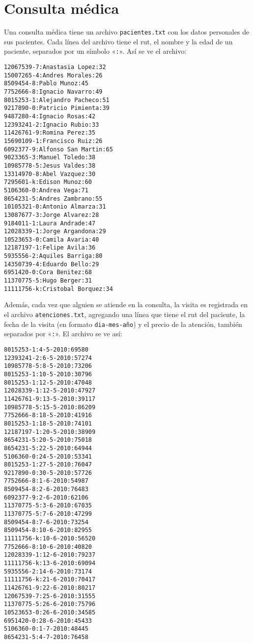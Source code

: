 \section{Consulta médica}

Una consulta médica tiene un archivo \lstinline!pacientes.txt! con los
datos personales de sus pacientes. Cada línea del archivo tiene el rut,
el nombre y la edad de un paciente, separados por un símbolo
«\lstinline!:!». Así se ve el archivo:

\begin{lstlisting}[language=file]
12067539-7:Anastasia Lopez:32
15007265-4:Andres Morales:26
8509454-8:Pablo Munoz:45
7752666-8:Ignacio Navarro:49
8015253-1:Alejandro Pacheco:51
9217890-0:Patricio Pimienta:39
9487280-4:Ignacio Rosas:42
12393241-2:Ignacio Rubio:33
11426761-9:Romina Perez:35
15690109-1:Francisco Ruiz:26
6092377-9:Alfonso San Martin:65
9023365-3:Manuel Toledo:38
10985778-5:Jesus Valdes:38
13314970-8:Abel Vazquez:30
7295601-k:Edison Munoz:60
5106360-0:Andrea Vega:71
8654231-5:Andres Zambrano:55
10105321-0:Antonio Almarza:31
13087677-3:Jorge Alvarez:28
9184011-1:Laura Andrade:47
12028339-1:Jorge Argandona:29
10523653-0:Camila Avaria:40
12187197-1:Felipe Avila:36
5935556-2:Aquiles Barriga:80
14350739-4:Eduardo Bello:29
6951420-0:Cora Benitez:68
11370775-5:Hugo Berger:31
11111756-k:Cristobal Borquez:34
\end{lstlisting}

Además, cada vez que alguien se atiende en la consulta, la visita es
registrada en el archivo \lstinline!atenciones.txt!, agregando una línea
que tiene el rut del paciente, la fecha de la visita (en formato
\texttt{dia-mes-año}) y el precio de la atención, también separados
por «\lstinline!:!». El archivo se ve así:

\begin{lstlisting}[language=file]
8015253-1:4-5-2010:69580
12393241-2:6-5-2010:57274
10985778-5:8-5-2010:73206
8015253-1:10-5-2010:30796
8015253-1:12-5-2010:47048
12028339-1:12-5-2010:47927
11426761-9:13-5-2010:39117
10985778-5:15-5-2010:86209
7752666-8:18-5-2010:41916
8015253-1:18-5-2010:74101
12187197-1:20-5-2010:38909
8654231-5:20-5-2010:75018
8654231-5:22-5-2010:64944
5106360-0:24-5-2010:53341
8015253-1:27-5-2010:76047
9217890-0:30-5-2010:57726
7752666-8:1-6-2010:54987
8509454-8:2-6-2010:76483
6092377-9:2-6-2010:62106
11370775-5:3-6-2010:67035
11370775-5:7-6-2010:47299
8509454-8:7-6-2010:73254
8509454-8:10-6-2010:82955
11111756-k:10-6-2010:56520
7752666-8:10-6-2010:40820
12028339-1:12-6-2010:79237
11111756-k:13-6-2010:69094
5935556-2:14-6-2010:73174
11111756-k:21-6-2010:70417
11426761-9:22-6-2010:80217
12067539-7:25-6-2010:31555
11370775-5:26-6-2010:75796
10523653-0:26-6-2010:34585
6951420-0:28-6-2010:45433
5106360-0:1-7-2010:48445
8654231-5:4-7-2010:76458
\end{lstlisting}

